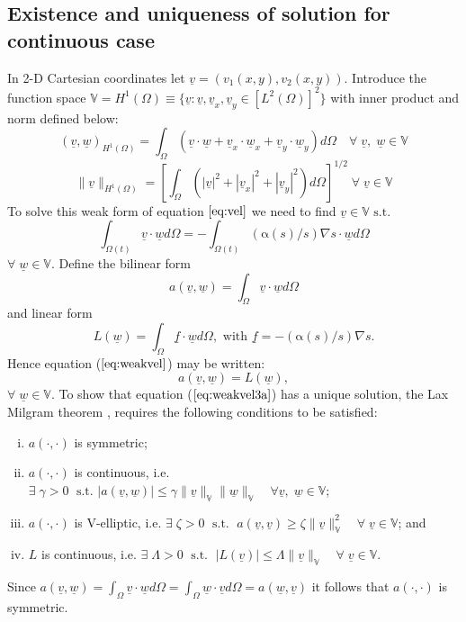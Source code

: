 \documentclass[11pt]{article}
\newcommand{\ul}{\underline}
\newcommand{\bigv}{\mathbb{V}}
\newcommand{\Om}{\Omega}
\newcommand{\al}{\mathrm{\alpha}}
\begin{document}
\subsection{Existence and uniqueness of solution for continuous case}
In 2-D Cartesian coordinates let $\ul{v} = (v_1(x,y),v_2(x,y))$. Introduce the function space $ \bigv = H^1(\Om)\equiv\{\ul{v}: \ul{v}, \ul{v}_x, \ul{v}_y  \in [{L}^2(\Omega)]^2\}$ with inner product and norm defined below:
$$(\ul{v},\ul{w})_{H^{1}(\Om)} = \int_{\Om}(\ul{v}\cdot\ul{w}+ \ul{v}_x\cdot\ul{w}_x + \ul{v}_y\cdot\ul{w}_y )d\Om\quad \forall \;\ul{v},\; \ul{w} \in\bigv$$
$$ \|\ul{v}\|_{H^1(\Om)} =\left[ \int_{\Om} (|\ul{v}|^2 + |\ul{v}_x|^2 +|\ul{v}_y|^2 )d\Om\right]^{1/2}\; \forall \;\ul{v}\in\bigv$$
To solve this weak form of equation $\ref{eq:vel}$ we need to find $\ul{v} \in \bigv \text{ s.t. }$
\begin{equation}
\label{eq:weakvel}
\int_{\Omega(t)} \ul{v}\cdot\ul{w}d{\Omega} =  -\int_{\Omega(t)}(\al(s)/s)\nabla{s}\cdot\ul{w}d{\Omega}
\end{equation}
$\forall\; \ul{w} \in \bigv$.
Define the bilinear form $$a(\ul{v},\ul{w}) = \int_{\Om}\ul{v}\cdot\ul{w}d{\Om}$$ and linear form $$L(\ul{w}) =  \int_{\Om}\ul{f}\cdot\ul{w}d\Om, \text{ with } \ul{f} = -(\al(s)/s)\nabla{s}.$$
Hence equation ($\ref{eq:weakvel}$) may be written:
\begin{equation}
\label{eq:weakvel3a}
a(\ul{v},\ul{w}) = L(\ul{w}),
\end{equation}
$\forall\; \ul{w} \in \bigv.$
To show that equation ($\ref{eq:weakvel3a}$) has a unique solution, the Lax Milgram theorem \cite{Lax2016}, requires the following conditions to be satisfied:
\begin{enumerate}[(i)]
\item $a(\cdot,\cdot)$ is symmetric;
\item $a(\cdot,\cdot)$ is continuous, i.e. $\exists\; \gamma >0\; \text{ s.t. } |a(\ul{v},\ul{w})| \leq \gamma\|\ul{v}\|_{\bigv}\|\ul{w}\|_{\bigv} \quad \forall \ul{v},\;\ul{w} \in \bigv$;
\item $a(\cdot,\cdot)$ is V-elliptic, i.e. $\exists\; \zeta > 0 \; \text{ s.t. } \; a(\ul{v},\ul{v}) \geq \zeta\|  \ul{v}   \|_{\bigv}^2\quad \forall \; \ul{v}\in\bigv$; and 
\item $L$ is continuous, i.e. $ \exists\; \Lambda > 0 \; \text{ s.t. } \; |L(\ul{v})| \leq \Lambda\|\ul{v}   \|_{\bigv}\quad \forall\;\ul{v} \in \bigv.$
\end{enumerate}
Since $a(\ul{v},\ul{w}) = \int_{\Om}\ul{v}\cdot\ul{w}d{\Om}= \int_{\Om}\ul{w}\cdot\ul{v}d{\Om}= a(\ul{w},\ul{v})$ it follows that $a(\cdot,\cdot)$ is symmetric.\\
\end{document}
